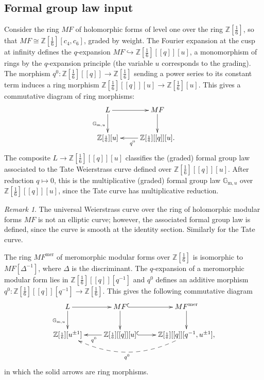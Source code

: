 \documentclass[10pt,a4paper]{amsart}
\theoremstyle{definition}
\theoremstyle{remark}
\newtheorem{rem}[thm]{Remark}
\newcommand{\zedsix}{{\zed[{\scriptstyle{\frac{1}{6}}}]}}
\newcommand{\zed}{\mathbb{Z}}
\newcommand{\mf}{{MF}}
\newcommand{\mfmero}{\mf^{\mathrm{mer}}}
\newcommand{\gmu}{{\mathbb{G}_{\mathrm{m}, u}}}
\begin{document}
\subsection{Formal group law input}
\label{subsect:fgl_input}

Consider the ring $\mf$ of
holomorphic forms of level one over the ring $\zedsix$, so that $\mf \cong \zedsix [c_4, c_6]$,
 graded by weight. The Fourier expansion at the cusp at infinity defines the
$q$-expansion $\mf\hookrightarrow \zedsix [[q]] [u]$, a
monomorphism of rings by the $q$-expansion principle (the variable $u$
corresponds to the grading). The morphism $q^0 :
\zedsix[[q]] \rightarrow \zedsix$ sending a  power series to its
constant term induces a ring morphism $\zedsix [[q]] [u] \rightarrow \zedsix [u]
$. This gives a commutative diagram of ring morphisms:
\begin{eqnarray}
\label{eqn:q0_hol}
	\xymatrix{
L
\ar[r]
\ar[d]_{\gmu}
&
\mf
\ar[d]
\\
\zedsix [u]
&
\zedsix [[q]][u] .
\ar[l]^{q^0}
}
\end{eqnarray}
The composite $L \rightarrow \zedsix [[q]][u]$ classifies the  (graded) formal
group law  associated to the Tate Weierstrass curve defined
over $\zedsix [[q]] [u]$. After reduction $q \mapsto 0$, this is the
multiplicative (graded) formal group law $\gmu$ over $\zedsix [[q]][u]$, since the Tate curve has
multiplicative reduction.


\begin{rem}
	The universal Weierstrass curve over the ring of holomorphic modular forms $\mf$ is not an elliptic curve;
however, the associated formal group law is
defined, since the curve is smooth at the identity section. Similarly for  the Tate curve.
\end{rem}

The ring $\mfmero$ of  meromorphic modular forms over $\zedsix$ is isomorphic
to $ \mf [\Delta^{-1}]$, where $\Delta$ is the discriminant. The $q$-expansion of a
meromorphic modular form lies in $\zedsix [[q]][q^{-1}]$ and $q^0$ defines an
additive morphism $q^0 : \zedsix [[q]][q^{-1}] \rightarrow \zedsix$. This
gives the following commutative diagram
\begin{eqnarray}
\label{eqn:mf-fgl}
	\xymatrix{
L
\ar[r]
\ar[d]_{\gmu}
&
\mf
\ar@{^(->}[r]
\ar[d]
&
\mfmero
\ar[d]
\\
\zedsix [u^{\pm 1}]
&
\zedsix [[q]][u]
\ar@{^(->}[r]
\ar[l]^{q^0}
&
\zedsix [[q]][q^{-1},u^{\pm 1}],
\ar@{-->}@/^2pc/[ll]^{q^0}
}
\end{eqnarray}
in which the solid arrows are ring morphisms.
\end{document}
